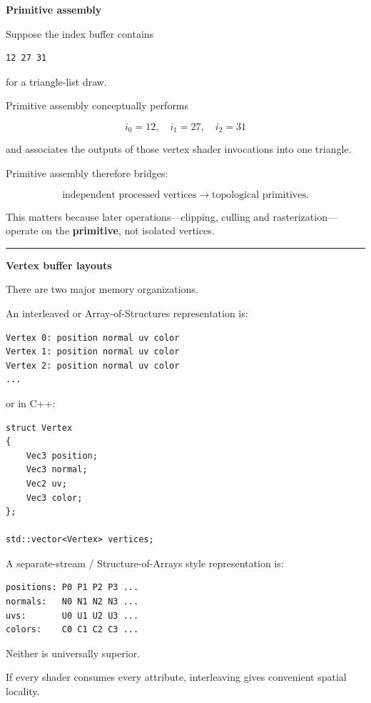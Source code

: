 \textbf{Primitive assembly}

Suppose the index buffer contains

\begin{verbatim}
12 27 31
\end{verbatim}

for a triangle-list draw.

Primitive assembly conceptually performs

\[
i_0=12,\quad i_1=27,\quad i_2=31
\]

and associates the outputs of those vertex shader invocations into one triangle.

Primitive assembly therefore bridges:

\[
\text{independent processed vertices}
\rightarrow
\text{topological primitives}.
\]

This matters because later operations---clipping, culling and rasterization---operate on the \textbf{primitive}, not isolated vertices.

\begin{center}\rule{0.5\linewidth}{0.5pt}\end{center}

\textbf{Vertex buffer layouts}

There are two major memory organizations.

An interleaved or Array-of-Structures representation is:

\begin{verbatim}
Vertex 0: position normal uv color
Vertex 1: position normal uv color
Vertex 2: position normal uv color
...
\end{verbatim}

or in C++:

\begin{verbatim}
struct Vertex
{
    Vec3 position;
    Vec3 normal;
    Vec2 uv;
    Vec3 color;
};

std::vector<Vertex> vertices;
\end{verbatim}

A separate-stream / Structure-of-Arrays style representation is:

\begin{verbatim}
positions: P0 P1 P2 P3 ...
normals:   N0 N1 N2 N3 ...
uvs:       U0 U1 U2 U3 ...
colors:    C0 C1 C2 C3 ...
\end{verbatim}

Neither is universally superior.

If every shader consumes every attribute, interleaving gives convenient spatial locality.

